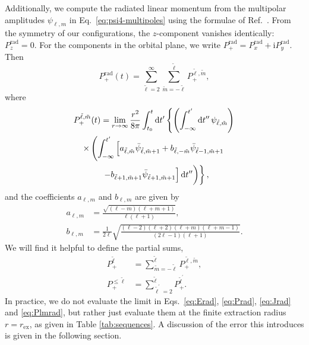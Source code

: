 \documentclass[floats,floatfix,showpacs,amssymb,prd,twocolumn,superscriptaddress,nofootinbib,nolongbibliography,reprint]{revtex4-2}
\newcommand{\us}[1]{{\textcolor{teal}{\sf{[US: #1]}} }}
\newcommand{\rad}{\mathrm{rad}}
\newcommand{\tl}{\tilde{\ell}}
\newcommand{\tm}{\tilde{m}}
\newcommand{\rmd}{\mathrm{d}}
\begin{document}
Additionally, we compute the radiated linear momentum from the multipolar
amplitudes $\psi_{\ell, m}$ in Eq.~\eqref{eq:psi4-multipoles} using the 
formulae of Ref.~\cite{Ruiz:2007yx}. From the symmetry of our 
configurations, the $z$-component vanishes identically: $P_z^{\rad}=0$.
For the components in the orbital plane, we write
$P_+^{\rad}=P_x^{\rad}+\mathrm{i}P_y^{\rad}$. Then
\begin{equation}
     P_+^{\rad}(t) = \sum_{\tl=2}^{\infty}
     \sum_{\tm=-\tl}^{\tl}P_+^{\tl,\tm},
     \label{eq:P+rad}
\end{equation}
where
\begin{multline}
    P_+^{\tl,\tm}(t) = \lim_{r\rightarrow \infty}
    \frac{r^2}{8\pi}\int_{t_0}^t\rmd t^{\prime}
    \left\{\left(\int^{t^\prime}_{-\infty}\rmd t^{\prime\prime}\, 
    \psi_{\tl,\tm}\right)\right. \\
    \times\left(\int_{-\infty}^{t^\prime} 
    \left[a_{\tl,\tm}\bar{\psi}_{\tl,\tm+1}+ 
    b_{\tl,-\tm}\bar{\psi}_{\tl-1,\tm+1}\right. \right.\\
    \left.\left.\vphantom{\int_{-\infty}^t}\left.-
    b_{\tl+1,\tm+1}\bar{\psi}_{\tl+1,\tm+1}\right]
    \rmd t^{\prime\prime}\right)\right\},
    \label{eq:Plmrad}
\end{multline}
and the coefficients $a_{\ell,m}$ and $b_{\ell,m}$ are given by
%
\begin{align}
    a_{\ell, m} &= \frac{\sqrt{\left(\ell - m\right)\left(\ell +
    m+1\right)}}{\ell\left(\ell + 1\right)},\\
    b_{\ell, m} &= \frac{1}{2\ell}\sqrt{\frac{\left(\ell - 2\right) 
    \left(\ell + 2\right) \left(\ell + m\right) \left(\ell + m - 
    1\right)}{\left(2\ell - 1\right)\left(\ell + 1\right)}}.
\end{align}
%
We will find it helpful to define the partial sums,
%
\begin{align}
    P_+^{\tl} &= \sum_{\tm = -\tl}^{\tl} P_+^{\tl,\tm},\\
    P_+^{\leq\tl} &= \sum_{\tl^\prime=2}^{\tl} P_+^{\tl^\prime}. 
    \label{eq:partialkick}
\end{align}
%
In practice, we do not evaluate the limit in Eqs.~\eqref{eq:Erad}, 
\eqref{eq:Prad}, \eqref{eq:Jrad} and \eqref{eq:Plmrad}, but rather just 
evaluate them at the finite extraction radius $r=r_{\mathrm{ex}}$, as given 
in Table \ref{tab:sequences}. A discussion of the error this introduces is 
given in the following section.
\end{document}
